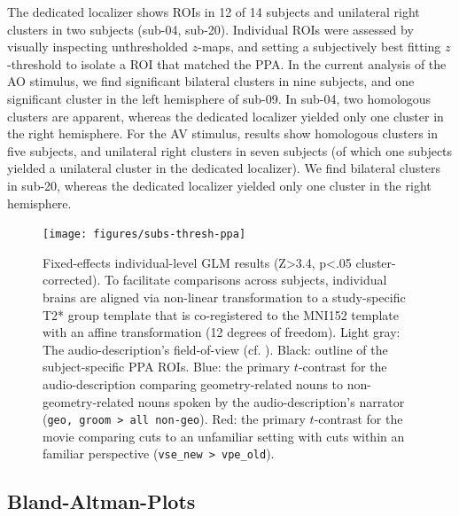 \documentclass[english]{article}
\begin{document}
The dedicated localizer \citep{sengupta2016extension} shows ROIs in 12 of 14
subjects and unilateral right clusters in two subjects (sub-04, sub-20).
Individual ROIs were assessed by visually inspecting unthresholded $z$-maps, and
setting a subjectively best fitting $z$-threshold to isolate a ROI that matched
the PPA.
In the current analysis of the AO stimulus, we find significant bilateral
clusters in nine subjects, and one significant cluster in the left hemisphere of
sub-09.
In sub-04, two homologous clusters are apparent, whereas the dedicated localizer
yielded only one cluster in the right hemisphere.
For the AV stimulus, results show homologous clusters in five subjects, and
unilateral right clusters in seven subjects (of which one subjects yielded a
unilateral cluster in the dedicated localizer).
We find bilateral clusters in sub-20, whereas the dedicated localizer yielded
only one cluster in the right hemisphere.



\begin{figure} \centering
    \texttt{[image: figures/subs-thresh-ppa]}
    \caption{Fixed-effects individual-level GLM results (Z>3.4, p<.05
    cluster-corrected). To facilitate comparisons across subjects, individual
    brains are aligned via non-linear transformation to a study-specific T2*
    group template that is co-registered to the MNI152 template with an affine
    transformation (12 degrees of freedom).
    Light gray: The
    audio-description's field-of-view (cf.  \citep{hanke2014audiomovie}).
    Black: outline of the subject-specific PPA ROIs.
    Blue:
    the primary $t$-contrast for the audio-description comparing
    geometry-related nouns to non-geometry-related nouns spoken by the
    audio-description's narrator (\texttt{geo, groom > all non-geo}).
    Red: the
    primary $t$-contrast for the movie comparing cuts to an unfamiliar setting
    with cuts within an familiar perspective (\texttt{vse\_new > vpe\_old}).
    } \label{fig:subs-thresh-ppa} \end{figure}


\subsection{Bland-Altman-Plots}

\end{document}
